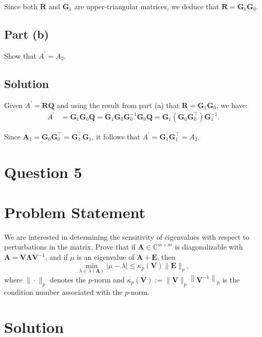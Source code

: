 \documentclass{article}
\begin{document}
Since both $\mathbf{R}$ and $\mathbf{G}_1$ are upper-triangular matrices, we deduce that $\mathbf{R} = \mathbf{G}_1 \mathbf{G}_0$.

\subsection*{Part (b)}

Show that $A^{\prime}=A_2$.

\subsection*{Solution}

Given $A^{\prime} = \mathbf{RQ}$ and using the result from part (a) that $\mathbf{R} = \mathbf{G}_1 \mathbf{G}_0$, we have:
\begin{align*}
    A^{\prime} &= \mathbf{G}_1 \mathbf{G}_0 \mathbf{Q} = \mathbf{G}_1 \mathbf{G}_0 \mathbf{G}_0^{-1} \mathbf{G}_0 \mathbf{Q} = \mathbf{G}_1 (\mathbf{G}_0 \mathbf{G}_0^\top) \mathbf{G}_1^{-1}.
\end{align*}

Since $\mathbf{A}_1 = \mathbf{G}_0 \mathbf{G}_0^\top = \mathbf{G}_1^\top \mathbf{G}_1$, it follows that $A^{\prime} = \mathbf{G}_1 \mathbf{G}_1^\top = A_2$.
\section{Question 5}
\section*{Problem Statement}

We are interested in determining the sensitivity of eigenvalues with respect to perturbations in the matrix. Prove that if $\boldsymbol{A} \in \mathbb{C}^{m \times m}$ is diagonalizable with $\boldsymbol{A}=\boldsymbol{V} \boldsymbol{\Lambda} \boldsymbol{V}^{-1}$, and if $\mu$ is an eigenvalue of $\boldsymbol{A}+\boldsymbol{E}$, then
\[
\min _{\lambda \in \lambda(\boldsymbol{A})}|\mu-\lambda| \leq \kappa_p(\boldsymbol{V})\|\boldsymbol{E}\|_p,
\]
where $\|\cdot\|_p$ denotes the $p$-norm and $\kappa_p(\boldsymbol{V}):=\|\boldsymbol{V}\|_p\left\|\boldsymbol{V}^{-1}\right\|_p$ is the condition number associated with the $p$-norm.

\section*{Solution}
\end{document}
